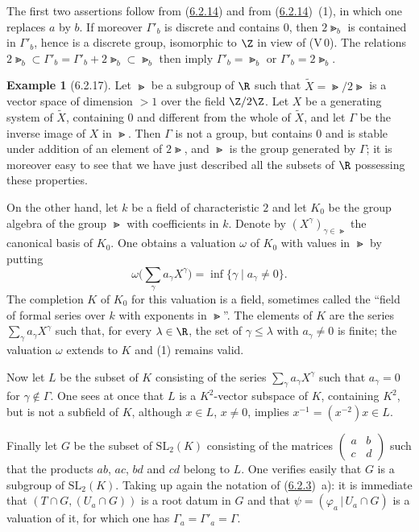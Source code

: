\documentclass[12pt,a4paper,oneside,english]{smfart}
\makeatletter
\newcommand{\btanchor}[1]{\leavevmode\Hy@raisedlink{\hypertarget{bt:#1}{}}}
\newcommand{\btpageanchor}[1]{\Hy@raisedlink{\hypertarget{p:#1}{}}}
\newcommand{\btref}[1]{\hyperlink{bt:#1}{#1}}
\newcommand{\btpage}[1]{\marginnote{p.~#1}\btpageanchor{#1}}
\newcommand{\pmark}[1]{\btpage{#1}}
\theoremstyle{definition}
\theoremstyle{bt}
\newtheorem{exam}{Example}
\makeatother
\begin{document}
The first two assertions follow from (\btref{6.2.14}) and from (\btref{6.2.14})~(1), in
which one replaces $a$ by $b$. If moreover $\Gamma'_b$ is discrete and
contains $0$, then $2\Gt_b$ is contained in $\Gamma'_b$, hence is a
discrete group, isomorphic to $\Z$ in view of (V\,0). The relations
$2\Gt_b\subset\Gamma'_b=\Gamma'_b+2\Gt_b\subset\Gt_b$ then imply
$\Gamma'_b=\Gt_b$ or $\Gamma'_b=2\Gt_b$.

\begin{exam}[6.2.17]\btanchor{6.2.17}
Let $\Gt$ be a subgroup of $\R$ such that $\widetilde{X}=\Gt/2\Gt$ is a
vector space of dimension $>1$ over the field $\Z/2\Z$. Let $X$ be a
generating system of $\widetilde{X}$, containing $0$ and different from the
whole of $\widetilde{X}$, and let $\Gamma$ be the inverse image of $X$ in
$\Gt$. Then $\Gamma$ is not a group, but contains $0$ and is stable under
addition of an element of $2\Gt$, and $\Gt$ is the group generated by
$\Gamma$; it is moreover easy to see that we have just described all the
subsets of $\R$ possessing these properties.
\end{exam}

\pmark{126}
On the other hand, let $k$ be a field of characteristic $2$ and let $K_0$ be
the group algebra of the group $\Gt$ with coefficients in $k$. Denote by
$(X^{\gamma})_{\gamma\in\Gt}$ the canonical basis of $K_0$. One obtains a
valuation $\omega$ of $K_0$ with values in $\Gt$ by putting
\begin{equation}
  \omega\Big(\sum_{\gamma}a_{\gamma}X^{\gamma}\Big)
   =\inf\{\gamma\mid a_{\gamma}\neq0\}.
\end{equation}
The completion $K$ of $K_0$ for this valuation is a field, sometimes called
the ``field of formal series over $k$ with exponents in $\Gt$''. The
elements of $K$ are the series $\sum_{\gamma}a_{\gamma}X^{\gamma}$ such
that, for every $\lambda\in\R$, the set of $\gamma\leq\lambda$ with
$a_{\gamma}\neq0$ is finite; the valuation $\omega$ extends to $K$ and (1)
remains valid.

Now let $L$ be the subset of $K$ consisting of the series
$\sum_{\gamma}a_{\gamma}X^{\gamma}$ such that $a_{\gamma}=0$ for
$\gamma\notin\Gamma$. One sees at once that $L$ is a $K^2$-vector subspace
of $K$, containing $K^2$, but is not a subfield of $K$, although $x\in L$,
$x\neq0$, implies $x^{-1}=(x^{-2})x\in L$.

Finally let $G$ be the subset of $\mathrm{SL}_2(K)$ consisting of the
matrices $\begin{pmatrix}a&b\\c&d\end{pmatrix}$ such that the products
$ab$, $ac$, $bd$ and $cd$ belong to $L$. One verifies easily that $G$ is a
subgroup of $\mathrm{SL}_2(K)$. Taking up again the notation of (\btref{6.2.3})~a):
it is immediate that $(T\cap G,(U_a\cap G))$ is a root datum in $G$ and that
$\psi=(\varphi_a\,|\,U_a\cap G)$ is a valuation of it, for which one has
$\Gamma_a=\Gamma'_a=\Gamma$.
\end{document}

